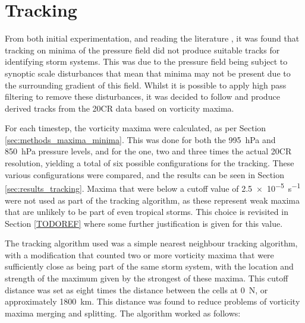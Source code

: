 \documentclass[pdftex,12pt,a4paper]{report}
\begin{document}
\section{Tracking}

From both initial experimentation, and reading the literature \parencite{TODOCITE multiple}, it was found
that tracking on minima of the pressure field did not produce suitable tracks for identifying
storm systems. This was due to the pressure field being subject to synoptic scale disturbances
that mean that minima may not be present due to the surrounding gradient of this field. Whilst it is
possible to apply high pass filtering to remove these disturbances, it was decided to follow
\textcite{TODOCITE multiple} and produce derived tracks from the 20CR data based on vorticity maxima.

For each timestep, the vorticity maxima were calculated, as per Section
\ref{sec:methods_maxima_minima}. This was done for both the \SI{995}{hPa} and \SI{850}{hPa} pressure
levels, and for the one, two and three times the actual 20CR resolution, yielding a total of six
possible configurations for the tracking. These various configurations were compared, and the
results can be seen in Section \ref{sec:results_tracking}. Maxima that were below a cutoff value
of \SI{2.5e-5}{s^{-1}} were not used as part of the tracking algorithm, as these represent weak maxima
that are unlikely to be part of even tropical storms. This choice is revisited in Section
\ref{TODOREF} where some further justification is given for this value.

The tracking algorithm used was a simple nearest neighbour tracking algorithm, with a modification
that counted two or more vorticity maxima that were sufficiently close as being part of the same storm
system, with the location and strength of the maximum given by the strongest of
these maxima. This cutoff distance was set as eight times the distance between the cells at
0\textdegree\ N, or approximately \SI{1800}{km}. This distance was found to reduce problems of
vorticity maxima merging and splitting. The algorithm worked as follows:
\end{document}
